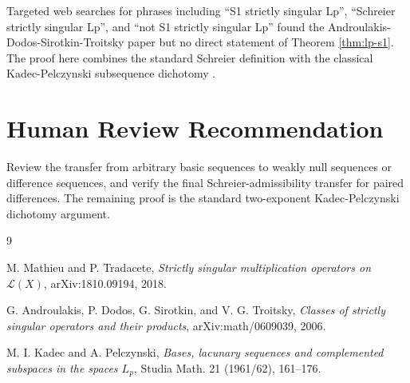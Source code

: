 \documentclass[11pt]{article}
\begin{document}
Targeted web searches for phrases including ``S1 strictly singular Lp'',
``Schreier strictly singular Lp'', and ``not S1 strictly singular Lp'' found
the Androulakis-Dodos-Sirotkin-Troitsky paper \cite{ADST} but no direct
statement of Theorem \ref{thm:lp-s1}.  The proof here combines the standard
Schreier definition with the classical Kadec-Pelczynski subsequence dichotomy
\cite{KP}.

\section*{Human Review Recommendation}

Review the transfer from arbitrary basic sequences to weakly null sequences or
difference sequences, and verify the final Schreier-admissibility transfer for
paired differences.  The remaining proof is the standard two-exponent
Kadec-Pelczynski dichotomy argument.

\begin{thebibliography}{9}

M. Mathieu and P. Tradacete,
\emph{Strictly singular multiplication operators on $\mathcal L(X)$},
arXiv:1810.09194, 2018.

G. Androulakis, P. Dodos, G. Sirotkin, and V. G. Troitsky,
\emph{Classes of strictly singular operators and their products},
arXiv:math/0609039, 2006.

M. I. Kadec and A. Pelczynski,
\emph{Bases, lacunary sequences and complemented subspaces in the spaces
$L_p$},
Studia Math. 21 (1961/62), 161--176.

\end{thebibliography}
\end{document}
